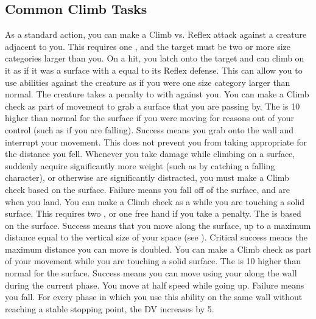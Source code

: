     \subsection{Common Climb Tasks}
        \label{Creature Climb} As a standard action, you can make a Climb vs. Reflex attack against a creature adjacent to you.
        This requires one , and the target must be two or more size categories larger than you.
        On a hit, you latch onto the target and can climb on it as if it was a surface with a  equal to its Reflex defense.
        This can allow you to use  abilities against the creature as if you were one size category larger than normal.
        The creature takes a  penalty to  with  against you.
         You can make a Climb check as part of movement to grab a surface that you are passing by.
        The  is 10 higher than normal for the surface if you were moving for reasons out of your control (such as if you are falling).
        Success means you grab onto the wall and interrupt your movement.
        This does not prevent you from taking  appropriate for the distance you fell.
         Whenever you take damage while climbing on a surface, suddenly acquire significantly more weight (such as by catching a falling character), or otherwise are significantly distracted, you must make a Climb check based on the surface.
        Failure means you fall off of the surface, and are \prone when you land.
         You can make a Climb check as a  while you are touching a solid surface.
        This requires two , or one free hand if you take a  penalty.
        The  is based on the surface.
        Success means that you move along the surface, up to a maximum distance equal to the vertical size of your space (see ).
        Critical success means the maximum distance you can move is doubled.
         You can make a Climb check as part of your movement while you are touching a solid surface.
        The  is 10 higher than normal for the surface.
        Success means you can move using your  along the wall during the current phase.
        You move at half speed while going up.
        Failure means you fall.
        For every phase in which you use this ability on the same wall without reaching a stable stopping point, the DV increases by 5.

